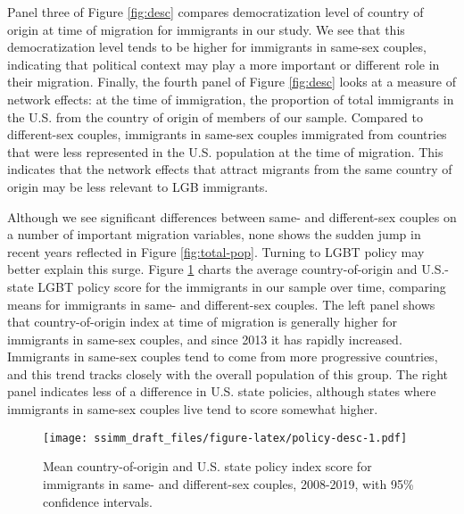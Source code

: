 \documentclass[
  11pt,
]{article}
\begin{document}
Panel three of Figure \ref{fig:desc} compares democratization level of country of origin at time of migration for immigrants in our study. We see that this democratization level tends to be higher for immigrants in same-sex couples, indicating that political context may play a more important or different role in their migration. Finally, the fourth panel of Figure \ref{fig:desc} looks at a measure of network effects: at the time of immigration, the proportion of total immigrants in the U.S. from the country of origin of members of our sample. Compared to different-sex couples, immigrants in same-sex couples immigrated from countries that were less represented in the U.S. population at the time of migration. This indicates that the network effects that attract migrants from the same country of origin may be less relevant to LGB immigrants.

Although we see significant differences between same- and different-sex couples on a number of important migration variables, none shows the sudden jump in recent years reflected in Figure \ref{fig:total-pop}. Turning to LGBT policy may better explain this surge. Figure \ref{fig:policy-desc} charts the average country-of-origin and U.S.-state LGBT policy score for the immigrants in our sample over time, comparing means for immigrants in same- and different-sex couples. The left panel shows that country-of-origin index at time of migration is generally higher for immigrants in same-sex couples, and since 2013 it has rapidly increased. Immigrants in same-sex couples tend to come from more progressive countries, and this trend tracks closely with the overall population of this group. The right panel indicates less of a difference in U.S. state policies, although states where immigrants in same-sex couples live tend to score somewhat higher.

\begin{figure}
\centering
\texttt{[image: ssimm\_draft\_files/figure-latex/policy-desc-1.pdf]}
\caption{\label{fig:policy-desc}Mean country-of-origin and U.S. state policy index score for immigrants in same- and different-sex couples, 2008-2019, with 95\% confidence intervals.}
\end{figure}
\end{document}
